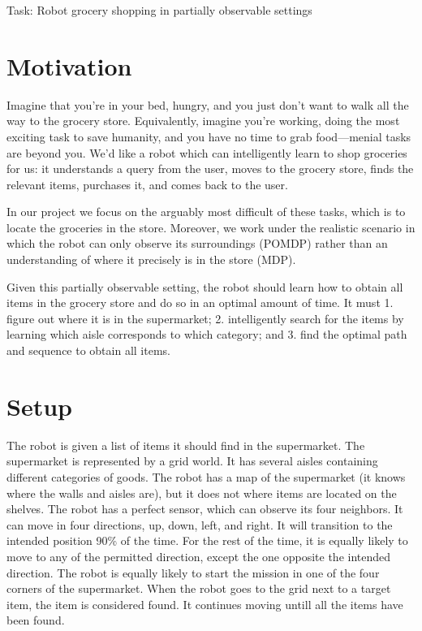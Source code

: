 \documentclass{pset}
\begin{document}

\begin{center}
\Large Task: Robot grocery shopping in partially observable settings
\end{center}
\section{Motivation}
\label{sec:motivation}
Imagine that you're in your bed, hungry, and you just don't want to walk
all the way to the grocery store. Equivalently, imagine you're working, doing the
most exciting task to save humanity, and you have no time to grab food---menial
tasks are beyond you. We'd like a robot which can intelligently learn to shop
groceries for us: it understands a query from the user, moves to the
grocery store, finds the relevant items, purchases it, and comes
back to the user.

In our project we focus on the arguably most difficult of
these tasks, which is to locate the groceries in the store. Moreover, we work
under the realistic
scenario in which the robot can only observe its surroundings (POMDP) rather
than an understanding of where it precisely is in the store (MDP).

Given this partially observable setting, the robot should learn how to obtain
all items in the grocery store and do so in an optimal amount of time. It must
1. figure out where it is in the supermarket;
2. intelligently search for the items by learning which aisle corresponds to
which category; and 3. find the optimal path and sequence to obtain all items.

\section{Setup}
The robot is given a list of items it should find in the supermarket. The supermarket is represented
by a grid world. It has several aisles containing different categories of goods.
The robot has a map of the supermarket (it knows where the walls and aisles are), but
it does not where items are located on the shelves. The robot has a perfect sensor, which can
observe its four neighbors. It can move in four directions, up, down, left, and right. It will
transition to the intended position 90\% of the time. For the rest of the time, it is equally likely
to move to any of the permitted direction, except the one opposite the intended direction. The robot
is equally likely to start the mission in one of the four corners of the supermarket. When the robot
goes to the grid next to a target item, the item is considered found. It continues moving untill all
the items have been found.
\end{document}
